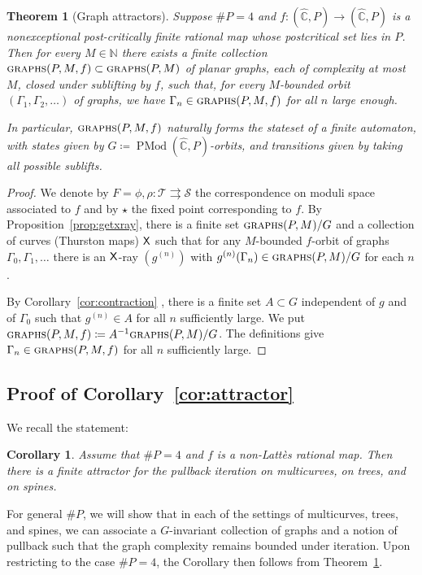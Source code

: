 \documentclass{amsart}
\newcommand\C{{\mathbb{C}}}
\newcommand\N{{\mathbb{N}}}
\newcommand\Pone{{\widehat\C}}
\newcommand\Mod{{\operatorname{PMod}}}
\newtheorem{thm}{Theorem}[section]
\newtheorem{maincor}[mainthm]{Corollary}
\theoremstyle{definition}
\theoremstyle{remark}
\newcommand{\sfX}{{\sf X}}
\newcommand{\cT}{\mathcal{T}}
\newcommand{\cS}{\mathcal{S}}
\newcommand{\graphs}{\text{\sc{graphs}}}
\begin{document}
\begin{thm}[Graph attractors] \label{thm:gga}
Suppose $\#P=4$ and $f\colon (\Pone,P)\to (\Pone, P)$ is a nonexceptional post-critically finite rational map whose postcritical set lies in $P$.  Then for every $M\in\N$ there exists a finite collection $\graphs(P,M,f)\subset \graphs(P,M)$ of planar graphs, each of complexity at most $M$, closed under sublifting by $f$,   such that, for every $M$-bounded orbit $(\Gamma_1, \Gamma_2, \ldots)$ of graphs, we have $\Gamma_n\in\graphs(P,M,f)$ for all $n$ large enough.

In particular, $\graphs(P,M,f)$ naturally forms the stateset of a finite automaton, with states given by $G\coloneqq\Mod(\Pone, P)$-orbits, and transitions given by taking all possible sublifts.
\end{thm}
\begin{proof}
We denote by $F=\phi, \rho\colon \cT \rightrightarrows\cS$ the correspondence on moduli space associated to $f$ and by $\star$ the fixed point corresponding to $f$.  
 By Proposition~\ref{prop:getxray}, there is a finite set $\graphs(P,M)/G$ and a collection of curves (Thurston maps) $\sfX$ such that for any $M$-bounded $f$-orbit of graphs $\Gamma_0, \Gamma_1, \ldots $ there is an $\sfX$-ray $(g^{(n)})$ with $g^{(n)}(\Gamma_n)\in \graphs(P,M)/G$ for each $n$.  
 
 By Corollary~\ref{cor:contraction} , there is a finite set $A \subset G$ independent of $g$ and of $\Gamma_0$ such that $g^{(n)}\in A$ for all $n$ sufficiently large. We put $\graphs(P,M,f)\coloneqq A^{-1}\graphs(P,M)/G$.  The definitions give $\Gamma_n\in \graphs(P,M,f)$ for all $n$ sufficiently large. 
\end{proof}

\subsection{Proof of Corollary~\ref{cor:attractor}}\label{ss:appinvgr}
We recall the statement:
\setcounter{mainthm}{1}
\begin{maincor}
  Assume that $\#P=4$ and $f$ is a non-Latt\`es rational map. Then there is a finite attractor for the pullback iteration on multicurves, on trees, and on spines.
\end{maincor}

For general $\#P$, we will show that in each of the settings of multicurves, trees, and spines, we can associate a $G$-invariant collection of graphs and a notion of pullback such that the graph complexity remains bounded under iteration.  Upon restricting to the case $\#P=4$, the Corollary then follows from Theorem~\ref{thm:gga}.
\end{document}
